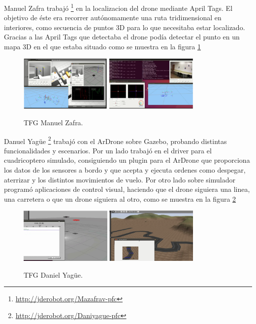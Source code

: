 \hspace{1 cm} Manuel Zafra trabaj\'o \footnote{\url{http://jderobot.org/Mazafrav-pfc}} \cite{MediaWikiManuelZafraVillar} en la localizacion del drone mediante April Tags. El objetivo de \'este era recorrer aut\'onomamente una ruta tridimensional en interiores, como secuencia de puntos 3D para lo que necesitaba estar localizado. Gracias a las April Tags que detectaba el drone pod\'ia detectar el punto en un mapa 3D en el que estaba situado como se muestra en la figura \ref{f:ManuelZafra}
\begin{figure}[H]
 \centering
    \includegraphics[width=0.4\textwidth]{imgs/ManuelZafra1_1.png}
    \includegraphics[width=0.4\textwidth]{imgs/ManuelZafra2_1.png}
 \caption{TFG Manuel Zafra.}
 \label{f:ManuelZafra}
\end{figure} 

\hspace{1 cm} Danuel Yag\"ue \footnote{\url{http://jderobot.org/Daniyague-pfc}} \cite{MediaWikiDanielYagueSanchez} trabaj\'o con el ArDrone sobre Gazebo, probando distintas funcionalidades y escenarios. Por un lado trabaj\'o en el driver para el cuadricoptero simulado, consiguiendo un plugin para el ArDrone que proporciona los datos de los sensores a bordo y que acepta y ejecuta ordenes como despegar, aterrizar y los distintos movimientos de vuelo. Por otro lado sobre simulador program\'o aplicaciones de control visual, haciendo que el drone siguiera una linea, una carretera o que un drone siguiera al otro, como se muestra en la figura \ref{f:DanielYague}
\begin{figure}[H]
 \centering
    \includegraphics[width=0.4\textwidth]{imgs/DaniYague1_1.png}
    \includegraphics[width=0.4\textwidth]{imgs/DaniYague2_1.png}
 \caption{TFG Daniel Yag\"ue.}
 \label{f:DanielYague}
\end{figure} 


